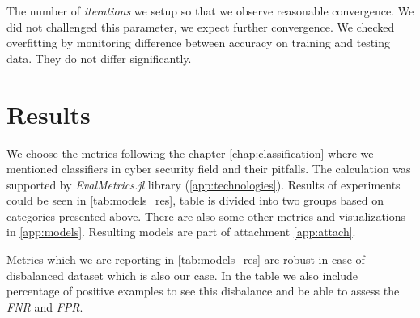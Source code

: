 The number of \emph{iterations} we setup so that we observe reasonable convergence. We did not challenged this parameter, we expect further convergence. We checked overfitting by monitoring difference between accuracy on training and testing data. They do not differ significantly.

\section{Results}
We choose the metrics following the chapter \ref{chap:classification} where we mentioned classifiers in cyber security field and their pitfalls. The calculation was supported by \emph{EvalMetrics.jl} library (\ref{app:technologies}). Results of experiments could be seen in \ref{tab:models_res}, table is divided into two groups based on categories presented above. There are also some other metrics and visualizations in \ref{app:models}. Resulting models are part of attachment \ref{app:attach}.

Metrics which we are reporting in \ref{tab:models_res} are robust in case of disbalanced dataset which is also our case. In the table we also include percentage of positive examples to see this disbalance and be able to assess the \emph{FNR} and \emph{FPR}.

